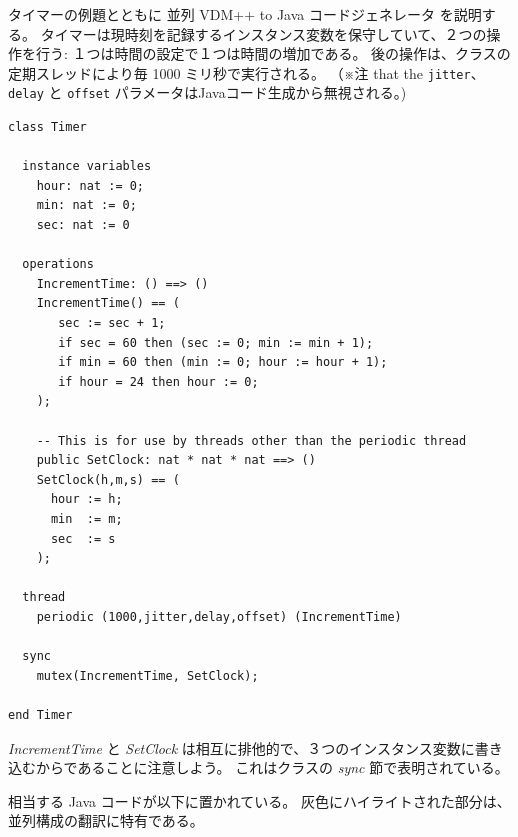 \documentclass[\pformat,11pt]{jarticle}
\newcommand{\cg}{VDM++ to Java コードジェネレータ}
\newcommand{\ccg}{並列 \cg}
\begin{document}
タイマーの例題とともに \ccg{} を説明する。
タイマーは現時刻を記録するインスタンス変数を保守していて、２つの操作を行う:
１つは時間の設定で１つは時間の増加である。
後の操作は、クラスの定期スレッドにより毎 1000 ミリ秒で実行される。
（※注 that the \texttt{jitter}、 \texttt{delay} と \texttt{offset} パラメータはJavaコード生成から無視される。)
\begin{verbatim}
class Timer

  instance variables
    hour: nat := 0;
    min: nat := 0;
    sec: nat := 0

  operations
    IncrementTime: () ==> ()
    IncrementTime() == (
       sec := sec + 1;
       if sec = 60 then (sec := 0; min := min + 1);
       if min = 60 then (min := 0; hour := hour + 1);
       if hour = 24 then hour := 0;
    );

    -- This is for use by threads other than the periodic thread
    public SetClock: nat * nat * nat ==> ()
    SetClock(h,m,s) == (
      hour := h;
      min  := m;
      sec  := s
    );

  thread
    periodic (1000,jitter,delay,offset) (IncrementTime)

  sync
    mutex(IncrementTime, SetClock);

end Timer
\end{verbatim}
 \textit{IncrementTime} と \textit{SetClock} は相互に排他的で、３つのインスタンス変数に書き込むからであることに注意しよう。
これはクラスの \textit{sync} 節で表明されている。

相当する Java コードが以下に置かれている。
灰色にハイライトされた部分は、並列構成の翻訳に特有である。
\end{document}
